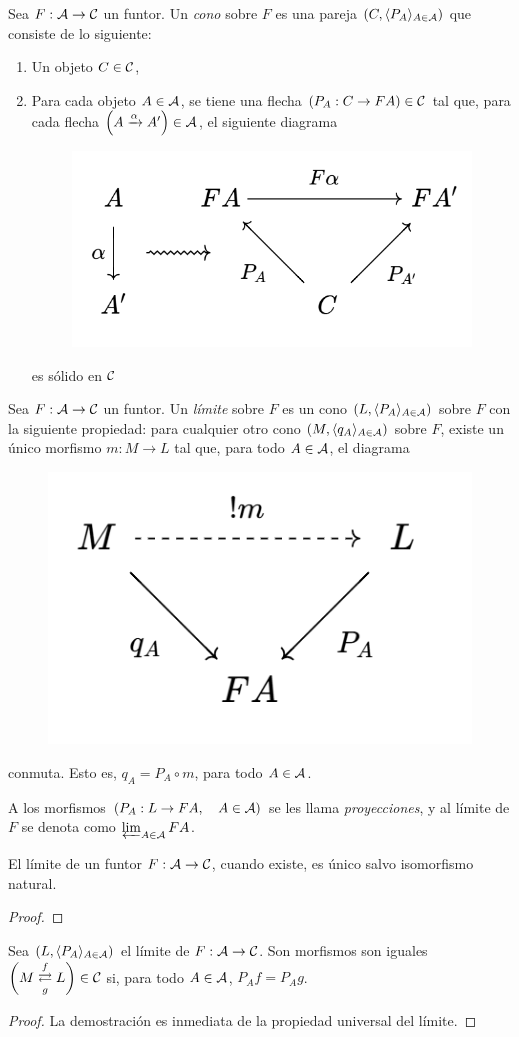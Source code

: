 \begin{definition}
    Sea $F:{\mathcal A}\to{\mathcal C}$ un funtor. Un \emph{cono} sobre $F$ es una pareja $(C,\langle P_A\rangle_{A\in{\mathcal A}})$ que consiste de lo siguiente:
    \begin{enumerate}
        \item Un objeto $C\in{\mathcal C}$,
        \item Para cada objeto $A\in{\mathcal A}$, se tiene una flecha $(P_A:C\to FA)\in{\mathcal C}$ tal que, para cada flecha $\left(A\xrightarrow{\alpha}A'\right)\in{\mathcal A}$, el siguiente diagrama 
        \begin{figure}[h!]
            \centering
            \includegraphics[width=0.35\linewidth]{img/diagrama1.png}
        \end{figure}
        es sólido en ${\mathcal C}$
    \end{enumerate}
\end{definition}
\begin{definition}
    Sea $F:{\mathcal A}\to{\mathcal C}$ un funtor. Un \emph{límite} sobre $F$ es un cono $(L,\langle P_A\rangle_{A\in{\mathcal A}})$ sobre $F$ con la siguiente propiedad: para cualquier otro cono $(M,\langle q_A\rangle_{A\in{\mathcal A}})$ sobre $F$, existe un único morfismo $m:M\to L$ tal que, para todo $A\in {\mathcal A}$, el diagrama
\begin{figure}[H]
    \centering
    \includegraphics[width=0.3\linewidth]{img/diagrama2.png}
\end{figure}
    conmuta. Esto es, $q_A=P_A\circ m$, para todo $A\in {\mathcal A}$.
\end{definition}
A los morfismos $(P_A:L\to FA,\quad A\in {\mathcal A})$ se les llama \emph{proyecciones}, y al límite de $F$ se denota como $\varprojlim_{A\in{\mathcal A}} FA$.
\begin{lema}
    El límite de un funtor $F:{\mathcal A}\to{\mathcal C}$, cuando existe, es único salvo isomorfismo natural.
\end{lema}
\begin{proof}
\end{proof}
\begin{lema}
    Sea $(L,\langle P_A\rangle_{A\in {\mathcal A}})$ el límite de $F:{\mathcal A}\to{\mathcal C}$. Son morfismos son iguales $\left(
M \overset{f}{\underset{g}{\rightleftarrows}} L \right)\in{\mathcal C}$ si, para todo $A\in {\mathcal A}$, $P_Af=P_Ag$.
\end{lema}
\begin{proof}
    La demostración es inmediata de la propiedad universal del límite. 
\end{proof}

